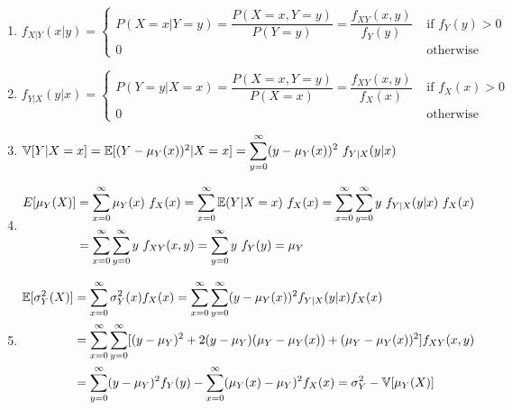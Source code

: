 \begin{enumerate}[resume*=calcrulesrv]
    \item
    $
        f _{X|Y} (x|y)
        = \begin{cases}
            P(X = x|Y = y)
            = \dfrac{P(X = x, Y = y)} {P(Y = y) }
            = \dfrac{f _{X Y} (x, y)} {f_Y (y) } & \text{ if } f _Y (y) > 0 \\
            0 & \text{ otherwise}
        \end{cases}
    $
    \hfill \cite{statistics/book/Statistics-for-Data-Scientists/Maurits-Kaptein}

    \item
    $
        f _{Y|X} (y|x)
        = \begin{cases}
            P(Y = y|X = x)
            = \dfrac{P(X = x, Y = y)} {P(X = x) }
            = \dfrac{f _{X Y} (x, y)} {f_X (x) } & \text{ if } f _X (x) > 0 \\
            0 & \text{ otherwise}
        \end{cases}
    $
    \hfill \cite{statistics/book/Statistics-for-Data-Scientists/Maurits-Kaptein}

    \item
    $
        \mathbb{V}[Y |X = x]
        = \mathbb{E}[(Y - \mu_Y (x))^2|X = x]
        = \displaystyle\sum^\infty_{y=0} (y - \mu_Y (x))^2\ f_{Y |X} (y|x)
    $
    \hfill \cite{statistics/book/Statistics-for-Data-Scientists/Maurits-Kaptein}

    \item 
    $
        \begin{aligned}
            E[\mu_Y (X)] 
            &= \dsum^\infty_{x=0} \mu_Y (x)\ f_X (x)
            = \dsum^\infty_{x=0} \mbbE(Y |X = x)\ f_X (x)
            = \dsum^\infty_{x=0} \dsum^\infty_{y=0} y\ f_{Y |X} (y|x)\ f_X (x) \\
            &= \dsum^\infty_{x=0} \dsum^\infty_{y=0} y\ f_{X Y} (x, y)
            = \dsum^\infty_{y=0} y\ f_Y (y) 
            = \mu_Y
        \end{aligned}
    $
    \hfill \cite{statistics/book/Statistics-for-Data-Scientists/Maurits-Kaptein}

    \item 
    $
        \begin{aligned}
            \mathbb{E}[\sigma^2_Y (X)]
            &= \displaystyle\sum^\infty_{x=0} \sigma^2_Y (x) f_X (x)
            = \displaystyle\sum^\infty_{x=0} \displaystyle\sum^\infty_{y=0} (y - \mu_Y (x))^2 f_{Y |X} (y|x) f_X (x) \\
            &= \displaystyle\sum^\infty_{x=0} \displaystyle\sum^\infty_{y=0} [(y - \mu_Y )^2 + 2(y - \mu_Y )(\mu_Y - \mu_Y (x)) + (\mu_Y - \mu_Y (x))^2] f_{X Y} (x, y) \\
            &= \displaystyle\sum^\infty_{y=0} (y - \mu_Y )^2 f_Y (y) - \displaystyle\sum^\infty_{x=0} (\mu_Y (x) - \mu_Y )^2 f_X (x)
            = \sigma^2_Y - \mathbb{V}[\mu_Y (X)]
        \end{aligned}
    $
    \hfill \cite{statistics/book/Statistics-for-Data-Scientists/Maurits-Kaptein}
\end{enumerate}




